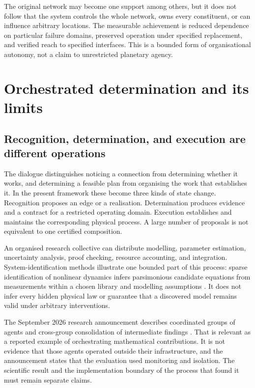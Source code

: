 \documentclass[11pt,a4paper]{article}
\theoremstyle{definition}
\theoremstyle{remark}
\begin{document}
The original network may become one support among others, but it does not follow that the system controls the whole network, owns every constituent, or can influence arbitrary locations. The measurable achievement is reduced dependence on particular failure domains, preserved operation under specified replacement, and verified reach to specified interfaces. This is a bounded form of organisational autonomy, not a claim to unrestricted planetary agency.

\section{Orchestrated determination and its limits}\label{sec:discovery}
\subsection{Recognition, determination, and execution are different operations}
The dialogue distinguishes noticing a connection from determining whether it works, and determining a feasible plan from organising the work that establishes it. In the present framework these become three kinds of state change. Recognition proposes an edge or a realisation. Determination produces evidence and a contract for a restricted operating domain. Execution establishes and maintains the corresponding physical process. A large number of proposals is not equivalent to one certified composition.

An organised research collective can distribute modelling, parameter estimation, uncertainty analysis, proof checking, resource accounting, and integration. System-identification methods illustrate one bounded part of this process: sparse identification of nonlinear dynamics infers parsimonious candidate equations from measurements within a chosen library and modelling assumptions \citep{sindy}. It does not infer every hidden physical law or guarantee that a discovered model remains valid under arbitrary interventions.

The September 2026 research announcement describes coordinated groups of agents and cross-group consolidation of intermediate findings \citep{openaiannounce}. That is relevant as a reported example of orchestrating mathematical contributions. It is not evidence that those agents operated outside their infrastructure, and the announcement states that the evaluation used monitoring and isolation. The scientific result and the implementation boundary of the process that found it must remain separate claims.
\end{document}
